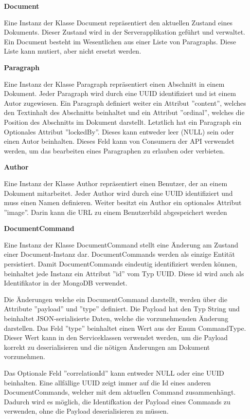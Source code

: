 \textbf{Document}

Eine Instanz der Klasse Document repräsentiert den aktuellen Zustand eines Dokuments.
Dieser Zustand wird in der Serverapplikation geführt und verwaltet.
Ein Document besteht im Wesentlichen aus einer Liste von Paragraphs.
Diese Liste kann mutiert, aber nicht ersetzt werden.

\textbf{Paragraph}

Eine Instanz der Klasse Paragraph repräsentiert einen Abschnitt in einem Dokument.
Jeder Paragraph wird durch eine UUID identifiziert und ist einem Autor zugewiesen.
Ein Paragraph definiert weiter ein Attribut ''content'',  welches den Textinhalt des Abschnitts beinhaltet und ein Attribut ''ordinal'', welches die Position des Abschnitts im Dokument darstellt.
Letztlich hat ein Paragraph ein Optionales Attribut ''lockedBy''.
Dieses kann entweder leer (NULL) sein oder einen Autor beinhalten.
Dieses Feld kann von Consumern der API verwendet werden, um das bearbeiten eines Paragraphen zu erlauben oder verbieten.

\textbf{Author}

Eine Instanz der Klasse Author repräsentiert einen Benutzer, der an einem Dokument mitarbeitet.
Jeder Author wird durch eine UUID identifiziert und muss einen Namen definieren.
Weiter besitzt ein Author ein optionales Attribut ''image''.
Darin kann die URL zu einem Benutzerbild abgespeichert werden

\clearpage

\textbf{DocumentCommand}

Eine Instanz der Klasse DocumentCommand stellt eine Änderung am Zustand einer Document-Instanz dar.
DocumentCommands werden als einzige Entität persistiert.
Damit DocumentCommands eindeutig identifiziert werden können, beinhaltet jede Instanz ein Attribut ''id'' vom Typ UUID\@.
Diese id wird auch als Identifikator in der MongoDB verwendet.

Die Änderungen welche ein DocumentCommand darstellt, werden über die Attribute ''payload'' und ''type'' definiert.
Die Payload hat den Typ String und beinhaltet JSON-serialisierte Daten, welche die vorzunehmenden Änderung darstellen.
Das Feld ''type'' beinhaltet einen Wert aus der Enum CommandType.
Dieser Wert kann in den Serviceklassen verwendet werden, um die Payload korrekt zu deserialisieren und die nötigen Änderungen am Dokument vorzunehmen.

Das Optionale Feld ''correlationId'' kann entweder NULL oder eine UUID beinhalten.
Eine allfällige UUID zeigt immer auf die Id eines anderen DocumentCommands, welcher mit dem aktuellen Command zusammenhängt.
Dadurch wird es möglich, die Identifkation der Payload eines Commands zu verwenden, ohne die Payload deserialisieren zu müssen.

